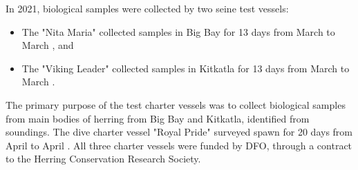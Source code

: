 In 2021, biological samples were collected by two seine test vessels:
\begin{itemize}
\item The "Nita Maria" collected samples in Big Bay for 13 days from March  to March , and
\item The "Viking Leader" collected samples in Kitkatla for 13 days from March  to March .
\end{itemize}
The primary purpose of the test charter vessels was to collect biological samples
from main bodies of herring from Big Bay and Kitkatla, identified from soundings.
The dive charter vessel "Royal Pride" surveyed spawn for 20 days from April  to April .
All three charter vessels were funded by DFO, through a contract to the Herring Conservation Research Society.
